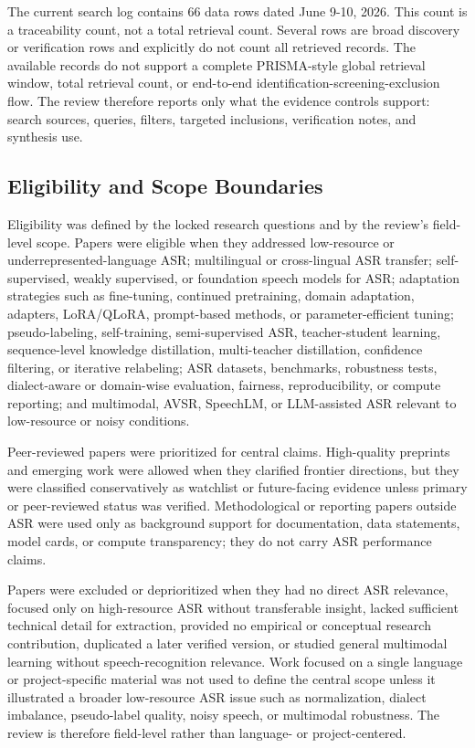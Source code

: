 \documentclass[pdflatex,sn-basic,iicol]{sn-jnl}
\theoremstyle{thmstyleone}
\theoremstyle{thmstyletwo}
\theoremstyle{thmstylethree}
\begin{document}
The current search log contains 66 data rows dated June 9-10, 2026. This count is a traceability count, not a total retrieval count. Several rows are broad discovery or verification rows and explicitly do not count all retrieved records. The available records do not support a complete PRISMA-style global retrieval window, total retrieval count, or end-to-end identification-screening-exclusion flow. The review therefore reports only what the evidence controls support: search sources, queries, filters, targeted inclusions, verification notes, and synthesis use.

\subsection{Eligibility and Scope Boundaries}

Eligibility was defined by the locked research questions and by the review's field-level scope. Papers were eligible when they addressed low-resource or underrepresented-language ASR; multilingual or cross-lingual ASR transfer; self-supervised, weakly supervised, or foundation speech models for ASR; adaptation strategies such as fine-tuning, continued pretraining, domain adaptation, adapters, LoRA/QLoRA, prompt-based methods, or parameter-efficient tuning; pseudo-labeling, self-training, semi-supervised ASR, teacher-student learning, sequence-level knowledge distillation, multi-teacher distillation, confidence filtering, or iterative relabeling; ASR datasets, benchmarks, robustness tests, dialect-aware or domain-wise evaluation, fairness, reproducibility, or compute reporting; and multimodal, AVSR, SpeechLM, or LLM-assisted ASR relevant to low-resource or noisy conditions.

Peer-reviewed papers were prioritized for central claims. High-quality preprints and emerging work were allowed when they clarified frontier directions, but they were classified conservatively as watchlist or future-facing evidence unless primary or peer-reviewed status was verified. Methodological or reporting papers outside ASR were used only as background support for documentation, data statements, model cards, or compute transparency; they do not carry ASR performance claims.

Papers were excluded or deprioritized when they had no direct ASR relevance, focused only on high-resource ASR without transferable insight, lacked sufficient technical detail for extraction, provided no empirical or conceptual research contribution, duplicated a later verified version, or studied general multimodal learning without speech-recognition relevance. Work focused on a single language or project-specific material was not used to define the central scope unless it illustrated a broader low-resource ASR issue such as normalization, dialect imbalance, pseudo-label quality, noisy speech, or multimodal robustness. The review is therefore field-level rather than language- or project-centered.
\end{document}
